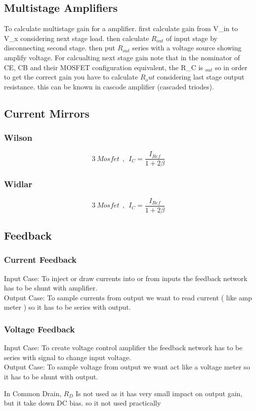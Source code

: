 \subsection{Multistage Amplifiers}
To calculate multistage gain for a amplifier. first calculate gain from V_{in} to V_x considering next stage load. then calculate $R_{out}$ of input stage by disconnecting second stage. then put $R_{out}$ series with a voltage source showing amplify voltage. For calcualting next stage gain note that in the nominator of CE, CB and their MOSFET configuration equivalent, the R_C is $_{out}$ so in order to get the correct gain you have to calculate $R_out$ considering last stage output resistance. this can be known in cascode amplifier (cascaded triodes).
\subsection{Current Mirrors}
\subsubsection{Wilson}
$$ 3~Mosfet ~~ , ~~ I_C = \frac{I_{Ref}}{1 + 2 \beta} $$
\par
\subsubsection{Widlar}
$$ 3~Mosfet ~~ , ~~ I_C = \frac{I_{Ref}}{1 + 2 \beta} $$
\par
\subsection{Feedback}
\subsubsection{Current Feedback}
Input Case: To inject or draw currents into or from inputs the feedback network has to be shunt with amplifier.\\
Output Case: To sample currents from output we want to read current ( like amp meter ) so it has to be series with output.\\
\lipsum[7-8]
\subsubsection{Voltage Feedback}
Input Case: To create voltage control amplifier the feedback network has to be series with signal to change input voltage.\\
Output Case: To sample voltage from output we want act like a voltage meter so it has to be shunt with output.
\par
\setlength{\parindent}{0.5cm} %
In Common Drain, $R_D$ Is not used as it has very small impact on output gain, but it take down DC bias. so it not used practically
\lipsum[1]
\setlength{\parindent}{0.0cm} 
